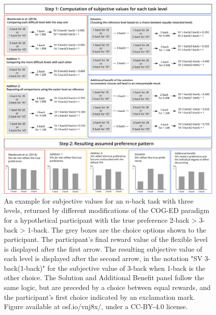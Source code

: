 \documentclass[
  man,floatsintext]{apa6}
\begin{document}
\begin{figure}[H]
\includegraphics[width=\textwidth]{../../Inkscape Figures/Paradigm_Scheme} \caption{An example for subjective values for an $n$-back task with three levels, returned by different modifications of the COG-ED paradigm for a hypothetical participant with the true preference 2-back > 3-back > 1-back. The grey boxes are the choice options shown to the participant. The participant's final reward value of the flexible level is displayed after the first arrow. The resulting subjective value of each level is displayed after the second arrow, in the notation "SV 3-back(1-back)" for the subjective value of 3-back when 1-back is the other choice. The Solution and Additional Benefit panel follow the same logic, but are preceded by a choice between equal rewards, and the participant's first choice indicated by an exclamation mark. Figure available at osf.io/vnj8x/, under a CC-BY-4.0 license.}\label{fig:cadparadigm}
\end{figure}
\end{document}
